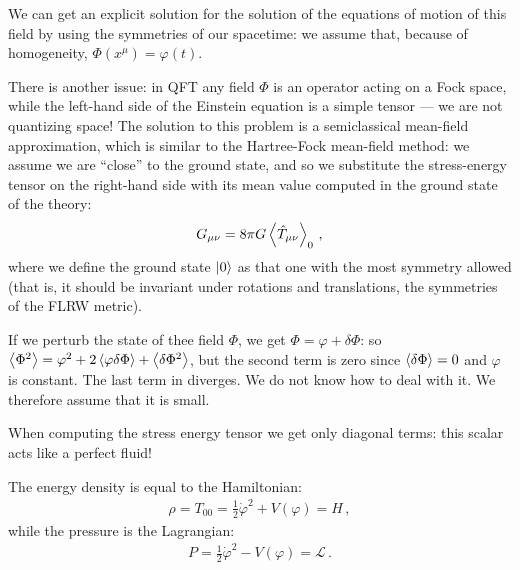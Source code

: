 \documentclass[main.tex]{subfiles}
\begin{document}



We can get an explicit solution for the solution of the equations of motion of this field by using the symmetries of our spacetime: we assume that, because of homogeneity, \(\Phi (x^{\mu }) = \varphi (t)\).

There is another issue: in QFT any field \(\Phi \) is an operator acting on a Fock space, while the left-hand side of the Einstein equation is a simple tensor --- we are not quantizing space!
The solution to this problem is a semiclassical mean-field approximation, which is similar to the Hartree-Fock mean-field method: 
we assume we are ``close'' to the ground state, and so we substitute the stress-energy tensor on the right-hand side with its mean value computed in the ground state of the theory:
%
\begin{align}
  G_{\mu \nu } = 8 \pi G \expval{\hat{T}_{\mu \nu } }_{0}
\,,
\end{align}
%
where we define the ground state \(\ket{0}\) as that one with the most symmetry allowed (that is, it should be invariant under rotations and translations, the symmetries of the FLRW metric).


If we perturb the state of thee field \(\Phi \), we get \(\Phi = \varphi + \delta \Phi \): so \(\expval{\Phi^2 } = \varphi^2 + 2 \expval{\varphi \delta \Phi } + \expval{ \delta \Phi^2}\), but the second term is zero since \(\expval{ \delta \Phi } = 0 \) and \(\varphi \) is constant.
The last term in diverges. We do not know how to deal with it.
We therefore assume that it is small.

When computing the stress energy tensor we get only diagonal terms: this scalar acts like a perfect fluid!

The energy density is equal to the Hamiltonian:
%
\begin{align}
  \rho = T_{00 } = \frac{1}{2} \dot{\varphi }^2 + V(\varphi ) = H
\,,
\end{align}
%
while the pressure is the Lagrangian: 
%
\begin{align}
  P = \frac{1}{2} \dot{\varphi}^2 - V(\varphi ) = \mathscr{L}
\,.
\end{align}
\end{document}
